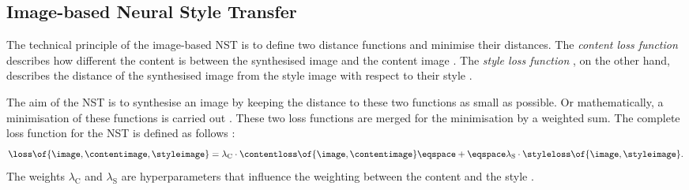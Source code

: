 \subsection{Image-based Neural Style Transfer}
The technical principle of the image-based \gls{NST} is to define two distance functions and minimise their distances. The \emph{content loss function} \contentloss{} describes how different the content is between the synthesised image \image{} and the content image \contentimage{}. The \emph{style loss function} \styleloss{}, on the other hand, describes the distance of the synthesised image \image{} from the style image \styleimage{} with respect to their style \cite{Glas2021}. 

The aim of the \gls{NST} is to synthesise an image by keeping the distance to these two functions as small as possible. Or mathematically, a minimisation of these functions is carried out \cite{Glas2021}. These two loss functions are merged for the minimisation by a weighted sum. The complete loss function \loss{} for the \gls{NST} is defined as follows \cite{GEB2016}:
\begin{equation*}
	\loss\of{\image\eqcommasep \contentimage\eqcommasep \styleimage} = \lambda_\text{C} \cdot \contentloss\of{\image\eqcommasep \contentimage} \eqspace+\eqspace \lambda_\text{S} \cdot \styleloss\of{\image\eqcommasep \styleimage} \eqtextdot
\end{equation*}
The weights $\lambda_\text{C}$ and $\lambda_\text{S}$ are hyperparameters that influence the weighting between the content and the style \cite{GEB2016}. 

